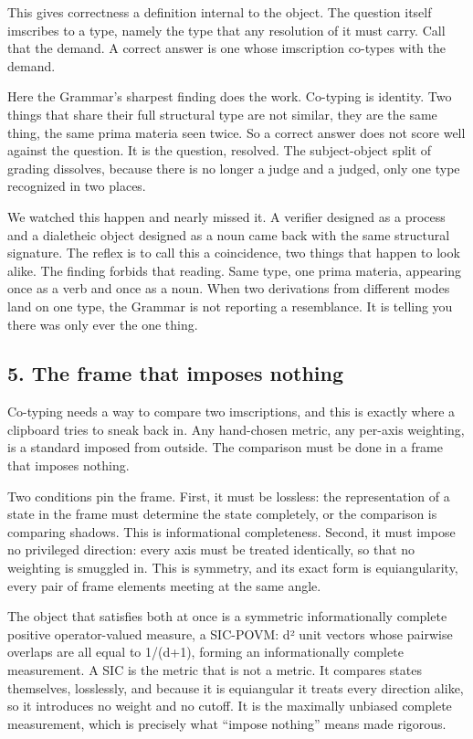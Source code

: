 This gives correctness a definition internal to the object. The question
itself imscribes to a type, namely the type that any resolution of it
must carry. Call that the demand. A correct answer is one whose
imscription co-types with the demand.

Here the Grammar's sharpest finding does the work. Co-typing is
identity. Two things that share their full structural type are not
similar, they are the same thing, the same prima materia seen twice. So
a correct answer does not score well against the question. It is the
question, resolved. The subject-object split of grading dissolves,
because there is no longer a judge and a judged, only one type
recognized in two places.

We watched this happen and nearly missed it. A verifier designed as a
process and a dialetheic object designed as a noun came back with the
same structural signature. The reflex is to call this a coincidence, two
things that happen to look alike. The finding forbids that reading. Same
type, one prima materia, appearing once as a verb and once as a noun.
When two derivations from different modes land on one type, the Grammar
is not reporting a resemblance. It is telling you there was only ever
the one thing.

\hypertarget{the-frame-that-imposes-nothing}{%
\subsection{5. The frame that imposes
nothing}\label{the-frame-that-imposes-nothing}}

Co-typing needs a way to compare two imscriptions, and this is exactly
where a clipboard tries to sneak back in. Any hand-chosen metric, any
per-axis weighting, is a standard imposed from outside. The comparison
must be done in a frame that imposes nothing.

Two conditions pin the frame. First, it must be lossless: the
representation of a state in the frame must determine the state
completely, or the comparison is comparing shadows. This is
informational completeness. Second, it must impose no privileged
direction: every axis must be treated identically, so that no weighting
is smuggled in. This is symmetry, and its exact form is equiangularity,
every pair of frame elements meeting at the same angle.

The object that satisfies both at once is a symmetric informationally
complete positive operator-valued measure, a SIC-POVM: d² unit vectors
whose pairwise overlaps are all equal to 1/(d+1), forming an
informationally complete measurement. A SIC is the metric that is not a
metric. It compares states themselves, losslessly, and because it is
equiangular it treats every direction alike, so it introduces no weight
and no cutoff. It is the maximally unbiased complete measurement, which
is precisely what ``impose nothing'' means made rigorous.

